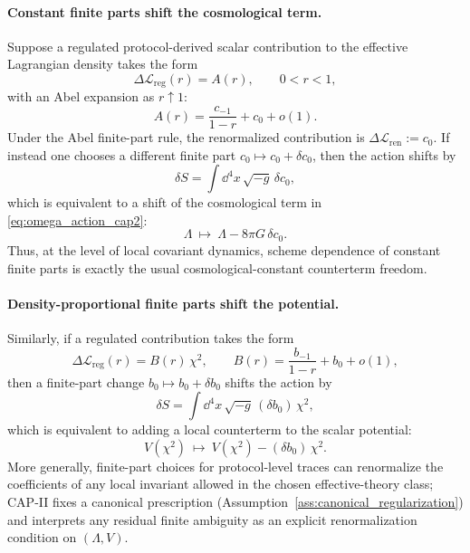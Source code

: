 \paragraph{Constant finite parts shift the cosmological term.}
Suppose a regulated protocol-derived scalar contribution to the effective Lagrangian density takes the form
\begin{equation}
  \Delta\mathcal{L}_{\mathrm{reg}}(r)
  = A(r),
  \qquad 0<r<1,
\end{equation}
with an Abel expansion as $r\uparrow 1$:
\begin{equation}
  A(r)=\frac{c_{-1}}{1-r}+c_0+o(1).
\end{equation}
Under the Abel finite-part rule, the renormalized contribution is $\Delta\mathcal{L}_{\mathrm{ren}}:=c_0$.
If instead one chooses a different finite part $c_0\mapsto c_0+\delta c_0$, then the action shifts by
\begin{equation}
  \delta S = \int \dd^4x\,\sqrt{-g}\,\delta c_0,
\end{equation}
which is equivalent to a shift of the cosmological term in \eqref{eq:omega_action_cap2}:
\begin{equation}
  \Lambda \ \mapsto\ \Lambda - 8\pi G\,\delta c_0.
\end{equation}
Thus, at the level of local covariant dynamics, scheme dependence of constant finite parts is exactly the usual cosmological-constant counterterm freedom.

\paragraph{Density-proportional finite parts shift the potential.}
Similarly, if a regulated contribution takes the form
\begin{equation}
  \Delta\mathcal{L}_{\mathrm{reg}}(r)
  = B(r)\,\chi^2,
  \qquad
  B(r)=\frac{b_{-1}}{1-r}+b_0+o(1),
\end{equation}
then a finite-part change $b_0\mapsto b_0+\delta b_0$ shifts the action by
\begin{equation}
  \delta S=\int \dd^4x\,\sqrt{-g}\,(\delta b_0)\,\chi^2,
\end{equation}
which is equivalent to adding a local counterterm to the scalar potential:
\begin{equation}
  V(\chi^2)\ \mapsto\ V(\chi^2)-(\delta b_0)\,\chi^2.
\end{equation}
More generally, finite-part choices for protocol-level traces can renormalize the coefficients of any local invariant allowed in the chosen effective-theory class; CAP-II fixes a canonical prescription (Assumption~\ref{ass:canonical_regularization}) and interprets any residual finite ambiguity as an explicit renormalization condition on $(\Lambda,V)$.


